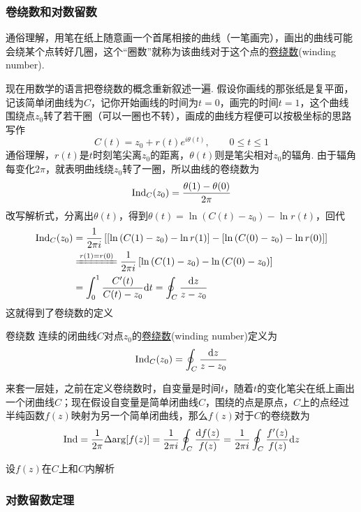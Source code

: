 \documentclass[main.tex]{subfiles}
\begin{document}
\subsubsection{卷绕数和对数留数}

通俗理解，用笔在纸上随意画一个首尾相接的曲线（一笔画完），画出的曲线可能会绕某个点转好几圈，这个“圈数”就称为该曲线对于这个点的\uline{卷绕数}(winding number).

现在用数学的语言把卷绕数的概念重新叙述一遍. 假设你画线的那张纸是复平面，记该简单闭曲线为\(C\)，记你开始画线的时间为\(t=0\)，画完的时间\(t=1\)，这个曲线围绕点\(z_0\)转了若干圈（可以一圈也不转），画成的曲线方程便可以按极坐标的思路写作
\[C(t) = z_0 + r(t)e^{i\theta(t)}, \qquad 0 \leq t \leq 1\]
通俗理解，\(r(t)\)是\(t\)时刻笔尖离\(z_0\)的距离，\(\theta(t)\)则是笔尖相对\(z_0\)的辐角. 由于辐角每变化\(2\pi\)，就表明曲线绕\(z_0\)转了一圈，所以曲线的卷绕数为
\[ {\rm Ind}_C(z_0) = \frac{\theta(1)-\theta(0)}{2\pi} \]
改写解析式，分离出\(\theta(t)\)，得到\(\theta(t) = \ln \left(C(t) - z_0\right) - \ln r(t)\)，回代
\begin{align*}
    \trm{Ind}_C(z_0) &= \frac{1}{2\pi i}\left[\left[\ln \left(C(1) - z_0\right) - \ln r(1)\right]-\left[\ln \left(C(0) - z_0\right) - \ln r(0)\right]\right] \\
    & \xlongequal[]{r(1)=r(0)} \frac{1}{2\pi i}\left[\ln \left(C(1) - z_0\right)-\ln \left(C(0) - z_0\right)\right] \\
    & = \int_{0}^{1} \frac{C'(t)}{C(t)-z_0} \trm{d}t = \oint_{C}\frac{\trm{d}z}{z-z_0}
\end{align*}
这就得到了卷绕数的定义
\begin{definition}{卷绕数}
    连续的闭曲线\(C\)对点\(z_0\)的\uline{卷绕数}(winding number)定义为
    \[{\rm Ind}_C(z_0) = \oint_{C}\frac{{\rm d}z}{z-z_0}\]
\end{definition}

来套一层娃，之前在定义卷绕数时，自变量是时间\(t\)，随着\(t\)的变化笔尖在纸上画出一个闭曲线\(C\)；现在假设自变量是简单闭曲线\(C\)，围绕的点是原点，\(C\)上的点经过半纯函数\(f(z)\)映射为另一个简单闭曲线，那么\(f(z)\)对于\(C\)的卷绕数为
\[{\rm Ind} = \frac{1}{2\pi}\Delta{\rm arg} [f(z)] = \frac{1}{2\pi i}\oint_{C}\frac{{\rm d}f(z)}{f(z)} = \frac{1}{2\pi i}\oint_{C}\frac{f'(z)}{f(z)}{\rm d}z\]

设\(f(z)\)在\(C\)上和\(C\)内解析
\subsubsection{对数留数定理}
\end{document}
